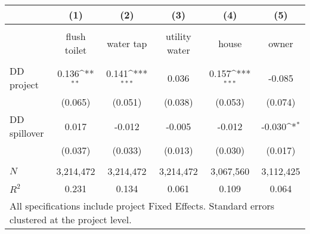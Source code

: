 {
\def\sym#1{\ifmmode^{#1}\else\(^{#1}\)\fi}
\begin{tabular}{l*{5}{c}}
 & (1) & (2) & (3) & (4) & (5)  \\[0.2em]
\hline\\[-0.9em]

             & flush toilet  & water tap    & utility water & house   & owner \\
[0.2em]\hline \\[-0.9em]

DD project   & 0.136\sym{**} & 0.141\sym{***} &  0.036      & 0.157\sym{***} &  -0.085  \\
             & (0.065)       & (0.051)        &  (0.038)    &(0.053)         &  (0.074)\\
[0.5em]
DD spillover & 0.017         & -0.012         &  -0.005     & -0.012  &  -0.030\sym{*} \\
             & (0.037)       & (0.033)        &  (0.013)    & (0.030) &  (0.017)     \\

\hline \\[-0.9em] 

\(N\)        & 3,214,472     &  3,214,472     &  3,214,472  &  3,067,560 &  3,112,425       \\
\(R^{2}\)    & 0.231         &    0.134       &    0.061    &    0.109   &    0.064         \\
\hline
\multicolumn{6}{l}{\tiny All specifications include project Fixed Effects. Standard errors clustered at the project level. }
\end{tabular}
}
